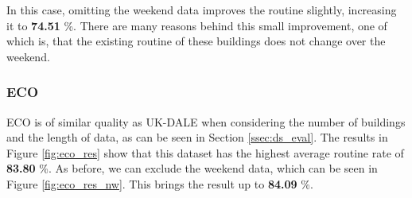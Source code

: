In this case, omitting the weekend data improves the routine slightly, increasing it to \textbf{74.51} \%.
There are many reasons behind this small improvement, one of which is, that the existing routine of these buildings does not change over the weekend.

\subsubsection{ECO}

ECO is of similar quality as UK-DALE when considering the number of buildings and the length of data, as can be seen in Section \ref{ssec:ds_eval}.
The results in Figure \ref{fig:eco_res} show that this dataset has the highest average routine rate of \textbf{83.80} \%.
As before, we can exclude the weekend data, which can be seen in Figure \ref{fig:eco_res_nw}. This brings the result up to \textbf{84.09} \%.


